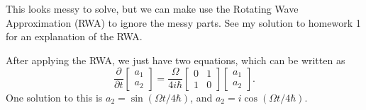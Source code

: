\documentclass{article}
\begin{document}
This looks messy to solve, but we can make use the Rotating Wave Approximation (RWA) to ignore the messy parts. See my solution to homework 1 for an explanation of the RWA.
\par
After applying the RWA, we just have two equations, which can be written as
\[ \frac{\partial}{\partial t} \begin{bmatrix}
    a_1 \\
    a_2
\end{bmatrix} = \frac{\Omega}{4i\hbar} \begin{bmatrix}
0 & 1 \\
1 & 0
\end{bmatrix} \begin{bmatrix}
    a_1 \\
    a_2
\end{bmatrix}. \]
One solution to this is $a_2 = \sin(\Omega t / 4 \hbar)$, and $a_2 = i\cos(\Omega t / 4 \hbar)$.
\end{document}
